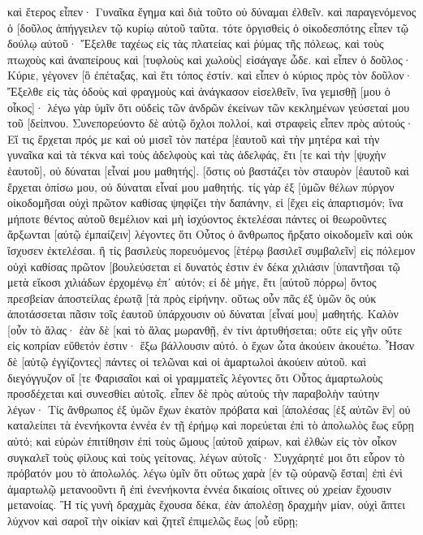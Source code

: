 καὶ ἕτερος εἶπεν· Γυναῖκα ἔγημα καὶ διὰ τοῦτο οὐ δύναμαι ἐλθεῖν. 
καὶ παραγενόμενος ὁ [δοῦλος ἀπήγγειλεν τῷ κυρίῳ αὐτοῦ ταῦτα. τότε ὀργισθεὶς ὁ οἰκοδεσπότης εἶπεν τῷ δούλῳ αὐτοῦ· Ἔξελθε ταχέως εἰς τὰς πλατείας καὶ ῥύμας τῆς πόλεως, καὶ τοὺς πτωχοὺς καὶ ἀναπείρους καὶ [τυφλοὺς καὶ χωλοὺς] εἰσάγαγε ὧδε. 
καὶ εἶπεν ὁ δοῦλος· Κύριε, γέγονεν [ὃ ἐπέταξας, καὶ ἔτι τόπος ἐστίν. 
καὶ εἶπεν ὁ κύριος πρὸς τὸν δοῦλον· Ἔξελθε εἰς τὰς ὁδοὺς καὶ φραγμοὺς καὶ ἀνάγκασον εἰσελθεῖν, ἵνα γεμισθῇ [μου ὁ οἶκος]· 
λέγω γὰρ ὑμῖν ὅτι οὐδεὶς τῶν ἀνδρῶν ἐκείνων τῶν κεκλημένων γεύσεταί μου τοῦ [δείπνου. 
Συνεπορεύοντο δὲ αὐτῷ ὄχλοι πολλοί, καὶ στραφεὶς εἶπεν πρὸς αὐτούς· 
Εἴ τις ἔρχεται πρός με καὶ οὐ μισεῖ τὸν πατέρα [ἑαυτοῦ καὶ τὴν μητέρα καὶ τὴν γυναῖκα καὶ τὰ τέκνα καὶ τοὺς ἀδελφοὺς καὶ τὰς ἀδελφάς, ἔτι [τε καὶ τὴν [ψυχὴν ἑαυτοῦ], οὐ δύναται [εἶναί μου μαθητής]. 
[ὅστις οὐ βαστάζει τὸν σταυρὸν [ἑαυτοῦ καὶ ἔρχεται ὀπίσω μου, οὐ δύναται εἶναί μου μαθητής. 
τίς γὰρ ἐξ [ὑμῶν θέλων πύργον οἰκοδομῆσαι οὐχὶ πρῶτον καθίσας ψηφίζει τὴν δαπάνην, εἰ [ἔχει εἰς ἀπαρτισμόν; 
ἵνα μήποτε θέντος αὐτοῦ θεμέλιον καὶ μὴ ἰσχύοντος ἐκτελέσαι πάντες οἱ θεωροῦντες ἄρξωνται [αὐτῷ ἐμπαίζειν] 
λέγοντες ὅτι Οὗτος ὁ ἄνθρωπος ἤρξατο οἰκοδομεῖν καὶ οὐκ ἴσχυσεν ἐκτελέσαι. 
ἢ τίς βασιλεὺς πορευόμενος [ἑτέρῳ βασιλεῖ συμβαλεῖν] εἰς πόλεμον οὐχὶ καθίσας πρῶτον [βουλεύσεται εἰ δυνατός ἐστιν ἐν δέκα χιλιάσιν [ὑπαντῆσαι τῷ μετὰ εἴκοσι χιλιάδων ἐρχομένῳ ἐπ᾽ αὐτόν; 
εἰ δὲ μήγε, ἔτι [αὐτοῦ πόρρω] ὄντος πρεσβείαν ἀποστείλας ἐρωτᾷ [τὰ πρὸς εἰρήνην. 
οὕτως οὖν πᾶς ἐξ ὑμῶν ὃς οὐκ ἀποτάσσεται πᾶσιν τοῖς ἑαυτοῦ ὑπάρχουσιν οὐ δύναται [εἶναί μου] μαθητής. 
Καλὸν [οὖν τὸ ἅλας· ἐὰν δὲ [καὶ τὸ ἅλας μωρανθῇ, ἐν τίνι ἀρτυθήσεται; 
οὔτε εἰς γῆν οὔτε εἰς κοπρίαν εὔθετόν ἐστιν· ἔξω βάλλουσιν αὐτό. ὁ ἔχων ὦτα ἀκούειν ἀκουέτω. 
Ἦσαν δὲ [αὐτῷ ἐγγίζοντες] πάντες οἱ τελῶναι καὶ οἱ ἁμαρτωλοὶ ἀκούειν αὐτοῦ. 
καὶ διεγόγγυζον οἵ [τε Φαρισαῖοι καὶ οἱ γραμματεῖς λέγοντες ὅτι Οὗτος ἁμαρτωλοὺς προσδέχεται καὶ συνεσθίει αὐτοῖς. 
εἶπεν δὲ πρὸς αὐτοὺς τὴν παραβολὴν ταύτην λέγων· 
Τίς ἄνθρωπος ἐξ ὑμῶν ἔχων ἑκατὸν πρόβατα καὶ [ἀπολέσας [ἐξ αὐτῶν ἓν] οὐ καταλείπει τὰ ἐνενήκοντα ἐννέα ἐν τῇ ἐρήμῳ καὶ πορεύεται ἐπὶ τὸ ἀπολωλὸς ἕως εὕρῃ αὐτό; 
καὶ εὑρὼν ἐπιτίθησιν ἐπὶ τοὺς ὤμους [αὐτοῦ χαίρων, 
καὶ ἐλθὼν εἰς τὸν οἶκον συγκαλεῖ τοὺς φίλους καὶ τοὺς γείτονας, λέγων αὐτοῖς· Συγχάρητέ μοι ὅτι εὗρον τὸ πρόβατόν μου τὸ ἀπολωλός. 
λέγω ὑμῖν ὅτι οὕτως χαρὰ [ἐν τῷ οὐρανῷ ἔσται] ἐπὶ ἑνὶ ἁμαρτωλῷ μετανοοῦντι ἢ ἐπὶ ἐνενήκοντα ἐννέα δικαίοις οἵτινες οὐ χρείαν ἔχουσιν μετανοίας. 
Ἢ τίς γυνὴ δραχμὰς ἔχουσα δέκα, ἐὰν ἀπολέσῃ δραχμὴν μίαν, οὐχὶ ἅπτει λύχνον καὶ σαροῖ τὴν οἰκίαν καὶ ζητεῖ ἐπιμελῶς ἕως [οὗ εὕρῃ; 
